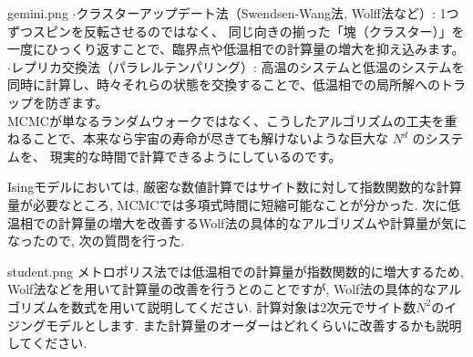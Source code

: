 \documentclass[a4paper,10.5pt]{jlreq}
\begin{document}
\begin{chatbox}{gemini.png}
$\cdot$クラスターアップデート法（Swendsen-Wang法, Wolff法など）: 1つずつスピンを反転させるのではなく、
同じ向きの揃った「塊（クラスター）」を一度にひっくり返すことで、臨界点や低温相での計算量の増大を抑え込みます。\\

$\cdot$レプリカ交換法（パラレルテンパリング）: 高温のシステムと低温のシステムを同時に計算し、時々それらの状態を交換することで、低温相での局所解へのトラップを防ぎます。\\

MCMCが単なるランダムウォークではなく、こうしたアルゴリズムの工夫を重ねることで、本来なら宇宙の寿命が尽きても解けないような巨大な $N^d$ のシステムを、
現実的な時間で計算できるようにしているのです。
\end{chatbox}

\newpage

\begin{explanation}[title=第2の質問]
Isingモデルにおいては, 厳密な数値計算ではサイト数に対して指数関数的な計算量が必要なところ, MCMCでは多項式時間に短縮可能なことが分かった. 
次に低温相での計算量の増大を改善するWolf法の具体的なアルゴリズムや計算量が気になったので, 次の質問を行った.
\end{explanation}

\begin{userchat}{student.png}
メトロポリス法では低温相での計算量が指数関数的に増大するため, Wolf法などを用いて計算量の改善を行うとのことですが, Wolf法の具体的なアルゴリズムを数式を用いて説明してください.
計算対象は2次元でサイト数$N^2$のイジングモデルとします. また計算量のオーダーはどれくらいに改善するかも説明してください.
\end{userchat}
\end{document}
